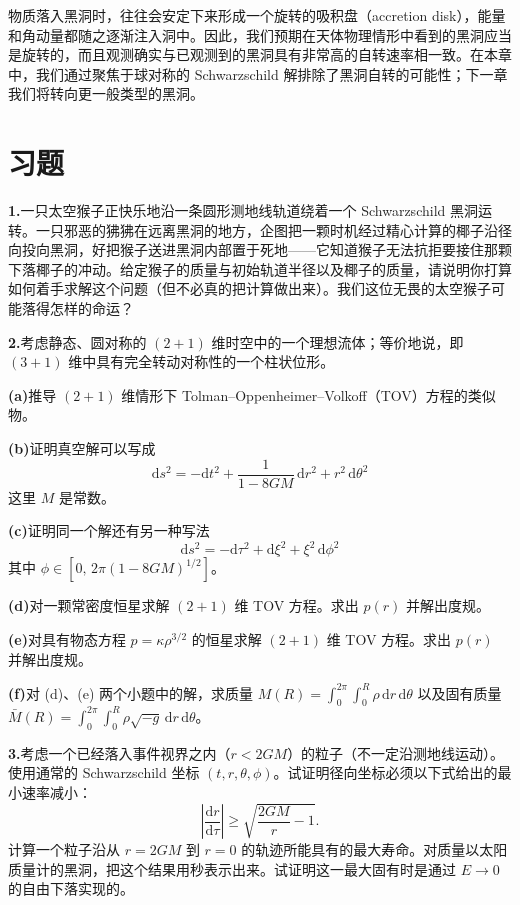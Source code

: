 物质落入黑洞时，往往会安定下来形成一个旋转的吸积盘（accretion disk），能量和角动量都随之逐渐注入洞中。因此，我们预期在天体物理情形中看到的黑洞应当是旋转的，而且观测确实与已观测到的黑洞具有非常高的自转速率相一致。在本章中，我们通过聚焦于球对称的 Schwarzschild 解排除了黑洞自转的可能性；下一章我们将转向更一般类型的黑洞。

\section{习题}

\textbf{1.}\quad 一只太空猴子正快乐地沿一条圆形测地线轨道绕着一个 Schwarzschild 黑洞运转。一只邪恶的狒狒在远离黑洞的地方，企图把一颗时机经过精心计算的椰子沿径向投向黑洞，好把猴子送进黑洞内部置于死地——它知道猴子无法抗拒要接住那颗下落椰子的冲动。给定猴子的质量与初始轨道半径以及椰子的质量，请说明你打算如何着手求解这个问题（但不必真的把计算做出来）。我们这位无畏的太空猴子可能落得怎样的命运？

\textbf{2.}\quad 考虑静态、圆对称的 $(2+1)$ 维时空中的一个理想流体；等价地说，即 $(3+1)$ 维中具有完全转动对称性的一个柱状位形。

\textbf{(a)}\quad 推导 $(2+1)$ 维情形下 Tolman--Oppenheimer--Volkoff（TOV）方程的类似物。

\textbf{(b)}\quad 证明真空解可以写成
\begin{equation*}
\mathrm{d}s^2 = -\mathrm{d}t^2 + \frac{1}{1-8GM}\,\mathrm{d}r^2 + r^2\,\mathrm{d}\theta^2
\end{equation*}
这里 $M$ 是常数。

\textbf{(c)}\quad 证明同一个解还有另一种写法
\begin{equation*}
\mathrm{d}s^2 = -\mathrm{d}\tau^2 + \mathrm{d}\xi^2 + \xi^2\,\mathrm{d}\phi^2
\end{equation*}
其中 $\phi\in\left[0,\,2\pi(1-8GM)^{1/2}\right]$。

\textbf{(d)}\quad 对一颗常密度恒星求解 $(2+1)$ 维 TOV 方程。求出 $p(r)$ 并解出度规。

\textbf{(e)}\quad 对具有物态方程 $p = \kappa\rho^{3/2}$ 的恒星求解 $(2+1)$ 维 TOV 方程。求出 $p(r)$ 并解出度规。

\textbf{(f)}\quad 对 (d)、(e) 两个小题中的解，求质量 $M(R) = \int_0^{2\pi}\int_0^R \rho\,\mathrm{d}r\,\mathrm{d}\theta$ 以及固有质量 $\bar{M}(R) = \int_0^{2\pi}\int_0^R \rho\sqrt{-g}\,\mathrm{d}r\,\mathrm{d}\theta$。

\textbf{3.}\quad 考虑一个已经落入事件视界之内（$r < 2GM$）的粒子（不一定沿测地线运动）。使用通常的 Schwarzschild 坐标 $(t, r, \theta, \phi)$。试证明径向坐标必须以下式给出的最小速率减小：
\begin{equation*}
\left|\frac{\mathrm{d}r}{\mathrm{d}\tau}\right| \geq \sqrt{\frac{2GM}{r} - 1}.
\end{equation*}
计算一个粒子沿从 $r = 2GM$ 到 $r = 0$ 的轨迹所能具有的最大寿命。对质量以太阳质量计的黑洞，把这个结果用秒表示出来。试证明这一最大固有时是通过 $E \to 0$ 的自由下落实现的。

